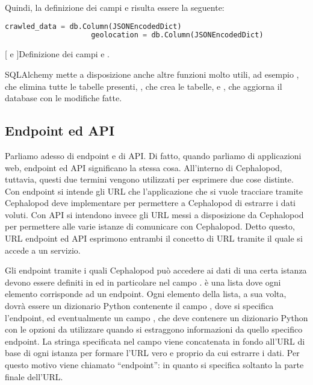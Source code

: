             Quindi, la definizione dei campi  e  risulta essere la seguente:
            
            \begin{center}
                \begin{lstlisting}[language=python, gobble=18]
                    crawled_data = db.Column(JSONEncodedDict)
                    geolocation = db.Column(JSONEncodedDict)
                \end{lstlisting}
                \captionsetup{textformat=empty,labelformat=empty} \vspace{-2em}
                [ e ]{Definizione dei campi  e .}
            \end{center}
            
            SQLAlchemy mette a disposizione anche altre funzioni molto utili, ad esempio , che elimina tutte le tabelle presenti, , che crea le tabelle, e , che aggiorna il database con le modifiche fatte.
    
        \subsection{Endpoint ed API} \label{subsec:it;di;endpoint_API}
        
            Parliamo adesso di endpoint e di \ac{API}. Di fatto, quando parliamo di applicazioni web, endpoint ed \ac{API} significano la stessa cosa. All'interno di Cephalopod, tuttavia, questi due termini vengono utilizzati per esprimere due cose distinte. Con endpoint si intende gli \ac{URL} che l'applicazione che si vuole tracciare tramite Cephalopod deve implementare per permettere a Cephalopod di estrarre i dati voluti. Con \ac{API} si intendono invece gli \ac{URL} messi a disposizione da Cephalopod per permettere alle varie istanze di comunicare con Cephalopod. Detto questo, \ac{URL} endpoint ed \ac{API} esprimono entrambi il concetto di \ac{URL} tramite il quale si accede a un servizio.
            
            Gli endpoint tramite i quali Cephalopod può accedere ai dati di una certa istanza devono essere definiti in  ed in particolare nel campo .  è una lista dove ogni elemento corrisponde ad un endpoint. Ogni elemento della lista, a sua volta, dovrà essere un dizionario Python contenente il campo , dove si specifica l'endpoint, ed eventualmente un campo , che deve contenere un dizionario Python con le opzioni da utilizzare quando si estraggono informazioni da quello specifico endpoint. La stringa specificata nel campo  viene concatenata in fondo all'\ac{URL} di base di ogni istanza per formare l'\ac{URL} vero e proprio da cui estrarre i dati. Per questo motivo viene chiamato ``endpoint'': in quanto si specifica soltanto la parte finale dell'\ac{URL}.
            
